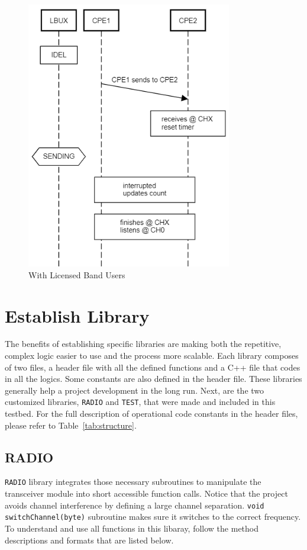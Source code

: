 \begin{figure}[ht]
{\begin{minipage}[c][1.7\width]{
	   0.4\textwidth}
	   \includegraphics[width=0.8\textwidth]{figures/sequence_diagram_interrupt.png}
	\end{minipage}}
\caption{With Licensed Band Users}
\label{fig:with_lbu}
\end{figure}

\section{Establish Library}

The benefits of establishing specific libraries are making both the repetitive, complex logic easier to use and the process more scalable. 
Each library composes of two files, a header file with all the defined functions and a C++ file that codes in all the logics. Some constants are 
also defined in the header file. These libraries generally help a project development in the long run. 
Next, are the two customized libraries, \texttt{RADIO} and \texttt{TEST}, that were made and included in this testbed. For the full description of operational code constants in the header files, please refer to Table~\ref{tab:structure}.

\subsection{RADIO}
\texttt{RADIO} library integrates those necessary subroutines to manipulate the transceiver module into short accessible function calls. Notice that the project avoids channel interference by defining a large channel separation. \texttt{void switchChannel(byte)} subroutine makes sure it switches to the correct frequency. To understand and use all functions in this libaray, follow the method descriptions and formats that are listed below.

